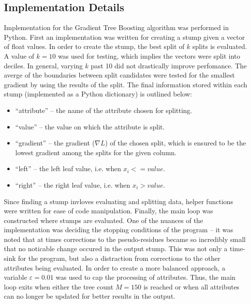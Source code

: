 \documentclass[letterpaper]{article} %
\begin{document}
\subsection{Implementation Details}
Implementation for the Gradient Tree Boosting algorithm was performed
in Python.
First an implementation was written for creating a stump
given a vector of float values. In order to create the stump,
the best split of $k$ splits is evaluated.
A value of $k = 10$ was used for testing, which implies the vectors were
split into deciles. In general, varying $k$ past 10 did not drastically improve perfomance.
The averge of the boundaries between split candidates were tested
for the smallest gradient by using the results of the split.
The final information stored within each stump
(implemented as a Python dictionary) is outlined below:
\bigskip
\begin{itemize}
\item ``attribute'' -- the name of the attribute chosen for splitting.
\item ``value'' -- the value on which the attribute is split.
\item ``gradient'' -- the gradient ($\nabla L$) of the chosen split,
which is ensured to be the lowest gradient among the splits for the given column.
\item ``left'' -- the left leaf value, i.e. when $x_i <= value$.
\item ``right'' -- the right leaf value, i.e. when $x_i > value$.
\end{itemize}
\bigskip
Since finding a stump invloves evaluating and splitting data,
helper functions were written for ease of code manipulation.
Finally, the main loop was constructed where stumps are evaluated.
One of the nuances of the implementation was deciding the
stopping conditions of the program --
it was noted that at times corrections to the pseudo-residues became so
incredibly small that no noticable change occured in the output stump.
This was not only a time-sink for the program, but also a distraction
from corrections to the other attributes being evaluated.
In order to create a more balanced approach, a variable $\varepsilon = 0.01$
was used to cap the processing of attributes.
Thus, the main loop exits when either the tree count $M = 150$ is reached
or when all attributes can no longer be updated for better results in the
output.
\end{document}

